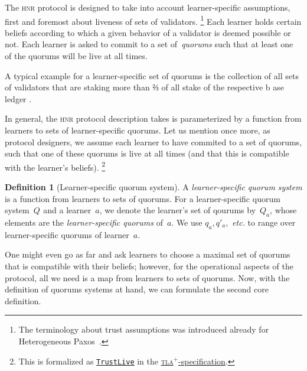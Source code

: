 \documentclass[%
dvipsnames
]{article}
\theoremstyle{definition}
\newtheorem{definition}{Definition}
\newcommand{\base}[1][ ]{%
  b\ase[#1]%
}
\newcommand{\ase}[1][ ]{%
  ase ledger%
  \ifthenelse{\equal{#1}{ }}{}{#1}\xspace%
}
\newcommand{\tla}[1][]{\textsc{tla}\ensuremath{{}^{+}}\xspace}
\newcommand{\hnr}{\textsc{hnr}\xspace}
\newcommand{\etc}[1][ ]{\emph{etc.}\xspace}
\newcommand{\Q}[1]{%
  Q_{#1}%
}
\newcommand{\q}[2][]{%
  q#1_{#2}%
}
\let\oldendnote\endnote
\renewcommand{\endnote}[2][ ]{%
  \ifthenelse{\equal{#1}{ }}%
  {\marginnote{\oldendnote{#2}}}%
  {\marginnote{\oldendnote[#1]{#2}}}%
}
\renewcommand{\todo}[2][]{}
\renewcommand{\endnote}[2][]{}
\newcounter{commited\v,\r}\setcounter{commited\v,\r}{0}%
\newcounter{old\v,\r}\setcounter{old\v,\r}{0}%
\begin{document}
The \hnr protocol is designed to take into account learner-specific assumptions, %
first and foremost about liveness of sets of validators.\xspace%
\footnote{%
  The terminology about trust assumptions was introduced %
  already for Heterogeneous Paxos \cite{opodis20HPaxos}. %
} %
Each learner holds certain beliefs %
according to which a given behavior of a validator is deemed %
possible or not.\xspace%
\todo{%
  double check with Isaac %
  that it is safe to use the terms %
  validator and acceptor %
  interchangeably %
}%
Each learner is asked to commit to a set of \emph{quorums}\xspace%
\todo{define\&explain}%
such that at least one of the quorums will be live at all times.\xspace%
\endnote{
  this is way too strong as an assumption, no ?
}%
\endnote{%
  on corroboration of liveness assumptions: %
  keep tabs on that there is enough progress
  that 
  \\-- \emph{could} stem from one of the quorums 
  \\-- \emph{has to} stem from one of the quorums 
}%
\endnote{%
  on blamable violations of liveness: %
  it seems impossible to prove that liveness assumptions are wrong, %
  unless we reduce liveness to safety, 
  by adding absolute limits for latency of responses 
  (which on top requires network synchrony)
}
A typical example for a learner-specific set of quorums
is the collection of all sets of validators that are staking more than ⅔ of all stake of the respective \base. 

In general,
the \hnr protocol description takes is parameterized by a function
from learners to sets of learner-specific quorums.
Let us mention once more, %
as protocol designers, %
we assume each learner to have commited to a set of quorums, %
such that one of these quorums is live at all times %
(and that this is compatible with the learner's beliefs).\xspace%
\footnote{%
  This is formalized as
  \href{https://github.com/anoma/typhon/blob/main/tla/HPaxos.tla\#L34}
  {\texttt{TrustLive}}
  in the
  \href{https://github.com/anoma/typhon/blob/main/tla/HPaxos.tla\#L34}
  {\tla-specification}.%
}



\begin{definition}[Learner-specific quorum system]
  \label{def:trustlive}
  A \emph{learner-specific quorum system} is a function from 
  learners to sets of quorums.
  For a {learner-specific quorum system}~\(\Q{}\)
  and a learner \(a\), 
  we denote the learner's set of qourums by \(\Q{a}\), 
  whose elements are the \emph{learner-specific quorums} of \(a\).
  We use \(\q{a}, \q[']a,\) \etc to range over learner-specific quorums of learner \(a\).
\end{definition} %
One might even go as far and ask learners to choose %
a maximal set of quorums that is compatible with their beliefs; %
however, %
for the operational aspects of the protocol,
all we need is a map from learners to sets of quorums. %
Now, with the definition of quorums systems at hand, 
we can formulate the second core definition. %
\end{document}
